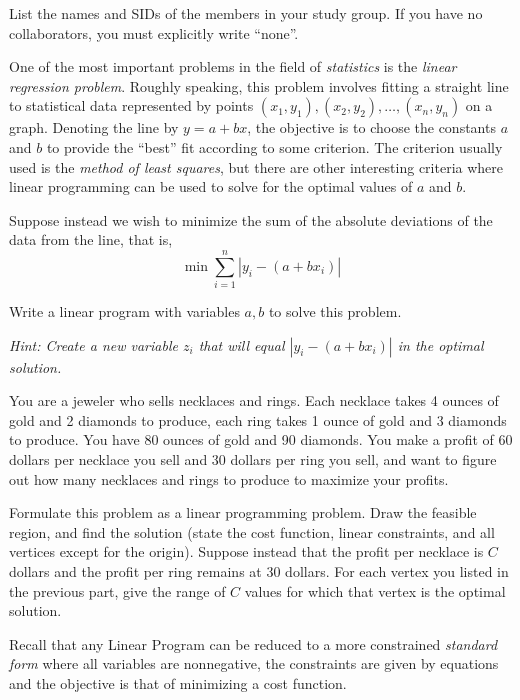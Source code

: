\documentclass{article}
\begin{document}
List the names and SIDs of the members in your study group.
If you have no collaborators, you must explicitly write ``none''.

One of the most important problems in the field of \emph{statistics} is the
\emph{linear regression problem}.
Roughly speaking, this problem involves fitting a straight line to statistical
data represented by points $(x_1, y_1), (x_2, y_2), \dotsc, (x_n, y_n)$
on a graph.
Denoting the line by $y=a + bx$, the objective is to choose the constants $a$
and $b$ to provide the ``best'' fit according to some criterion.
The criterion usually used is the \emph{method of least squares}, but there
are other interesting criteria where linear programming can be used to solve
for the optimal values of $a$ and $b$.


Suppose instead we wish to minimize the sum of the absolute deviations of the data from the line,
that is,
$$\min\sum_{i=1}^n \left|y_i - (a + bx_i)\right|$$

Write a linear program with variables $a, b$ to solve this problem.

\emph{Hint: Create a new variable $z_i$ that will equal $|y_i - (a + bx_i)|$ in the optimal solution.}


You are a jeweler who sells necklaces and rings. Each necklace takes 4 ounces of gold and 2 diamonds to produce, each ring takes 1 ounce of gold and 3 diamonds to produce. You have 80 ounces of gold and 90 diamonds. You make a profit of 60 dollars per necklace you sell and 30 dollars per ring you sell, and want to figure out how many necklaces and rings to produce to maximize your profits.

\begin{subparts}
\subpart Formulate this problem as a linear programming problem. Draw the feasible region, and
find the solution (state the cost function, linear constraints, and all vertices except for the origin).
\subpart Suppose instead that the profit per necklace is $C$ dollars and the profit per ring remains at 30 dollars. For each vertex you listed in the previous part, give the range of $C$ values for which that vertex is the optimal solution.
\end{subparts}

Recall that any Linear Program can be reduced to a more constrained \emph{standard form} where all variables are nonnegative, the constraints are given by equations and the objective is that of minimizing a cost function. 
\end{document}
